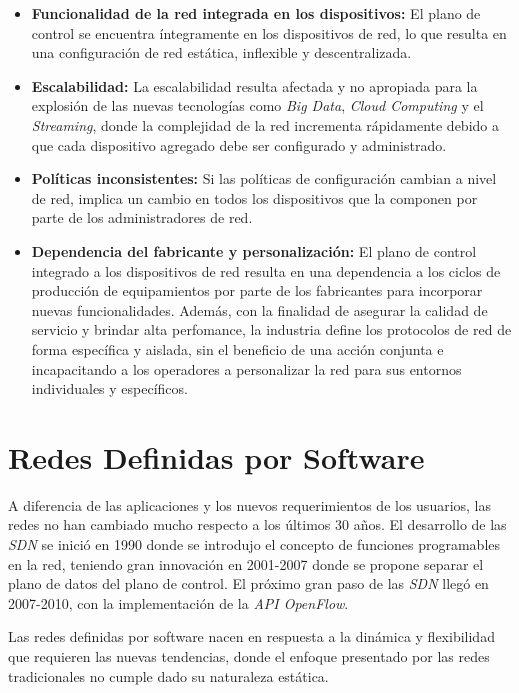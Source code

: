 \begin{itemize}
	\item \textbf{Funcionalidad de la red integrada en los dispositivos:} El plano de control se encuentra íntegramente en los dispositivos de red, lo que resulta en una configuración de red estática, inflexible y descentralizada. 
	\item \textbf{Escalabilidad:} La escalabilidad resulta afectada y no apropiada para la explosión de las nuevas tecnologías como \textit{Big Data}, \textit{Cloud Computing} y el \textit{Streaming}, donde la complejidad de la red incrementa rápidamente debido a que cada dispositivo agregado debe ser configurado y administrado.
	\item \textbf{Políticas inconsistentes:} Si las políticas de configuración cambian a nivel de red, implica un cambio en todos los dispositivos que la componen por parte de los administradores de red.
	\item \textbf{Dependencia del fabricante y personalización:} El plano de control integrado a los dispositivos de red resulta en una dependencia a los ciclos de producción de equipamientos por parte de los fabricantes para incorporar nuevas funcionalidades. Además, con la finalidad de asegurar la calidad de servicio y brindar alta perfomance, la industria define los protocolos de red de forma específica y aislada, sin el beneficio de una acción conjunta e incapacitando a los operadores a personalizar la red para sus entornos individuales y específicos. 
\end{itemize}

\section{Redes Definidas por Software} \label{sec:rsdn}

A diferencia de las aplicaciones y los nuevos requerimientos de los usuarios, las redes no han cambiado mucho respecto a los últimos 30 años. El desarrollo de las \textit{SDN} se inició en 1990 donde se introdujo el concepto de funciones programables en la red, teniendo gran innovación en 2001-2007 donde se propone separar el plano de datos del plano de control. El próximo gran paso de las \textit{SDN} llegó en 2007-2010, con la implementación de la \textit{API OpenFlow}.

Las redes definidas por software nacen en respuesta a la dinámica y flexibilidad que requieren las nuevas tendencias, donde el enfoque presentado por las redes tradicionales no cumple dado su naturaleza estática. 

